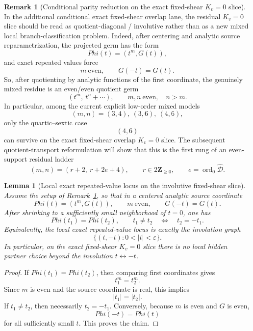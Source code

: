 \documentclass[11pt,a4paper]{amsart}
\def\Phi{Phi}%
\theoremstyle{plain}
\newtheorem{lemma}[theorem]{Lemma}
\theoremstyle{definition}
\newtheorem{remark}[theorem]{Remark}
\begin{document}
\begin{remark}[Conditional parity reduction on the exact fixed-shear $K_v=0$ slice]
\label{rem:conditional-parity-reduction-fixed-shear-Kv-zero}
In the additional conditional exact fixed-shear overlap lane, the residual
$K_v=0$ slice should be read as quotient-diagonal / involutive rather than as a
new mixed local branch-classification problem. Indeed, after centering and
analytic source reparametrization, the projected germ has the form
\[
\Phi(t)=(t^m,G(t)),
\]
and exact repeated values force
\[
m\ \text{even},
\qquad
G(-t)=G(t).
\]
So, after quotienting by analytic functions of the first coordinate, the
genuinely mixed residue is an even/even quotient germ
\[
(t^m,\ t^n+\cdots),
\qquad
m,n\ \text{even},\quad n>m.
\]
In particular, among the current explicit low-order mixed models
\[
(m,n)=(3,4),\ (3,6),\ (4,6),
\]
only the quartic--sextic case
\[
(4,6)
\]
can survive on the exact fixed-shear overlap $K_v=0$ slice. The subsequent
quotient-transport reformulation will show that this is the first rung of an
even-support residual ladder
\[
(m,n)=(r+2,\ r+2e+4),
\qquad
r\in 2\mathbf Z_{\ge 0},
\qquad
e=\operatorname{ord}_0\widehat{\mathcal D}.
\]
\end{remark}

\begin{lemma}[Local exact repeated-value locus on the involutive fixed-shear slice]
\label{lem:local-exact-repeated-value-locus-involutive-fixed-shear}
Assume the setup of
Remark~\ref{rem:conditional-parity-reduction-fixed-shear-Kv-zero}, so that in a
centered analytic source coordinate
\[
\Phi(t)=(t^m,G(t)),
\qquad
m\ \text{even},
\qquad
G(-t)=G(t).
\]
After shrinking to a sufficiently small neighborhood of $t=0$, one has
\[
\Phi(t_1)=\Phi(t_2),\qquad t_1\neq t_2
\quad\Longleftrightarrow\quad
t_2=-t_1.
\]
Equivalently, the local exact repeated-value locus is exactly the involution
graph
\[
\{(t,-t):0<|t|<\varepsilon\}.
\]
In particular, on the exact fixed-shear $K_v=0$ slice there is no local hidden
partner choice beyond the involution $t\leftrightarrow -t$.
\end{lemma}

\begin{proof}
If $\Phi(t_1)=\Phi(t_2)$, then comparing first coordinates gives
\[
t_1^m=t_2^m.
\]
Since $m$ is even and the source coordinate is real, this implies
\[
|t_1|=|t_2|.
\]
If $t_1\neq t_2$, then necessarily $t_2=-t_1$. Conversely, because $m$ is even
and $G$ is even,
\[
\Phi(-t)=\Phi(t)
\]
for all sufficiently small $t$. This proves the claim.
\end{proof}
\end{document}
